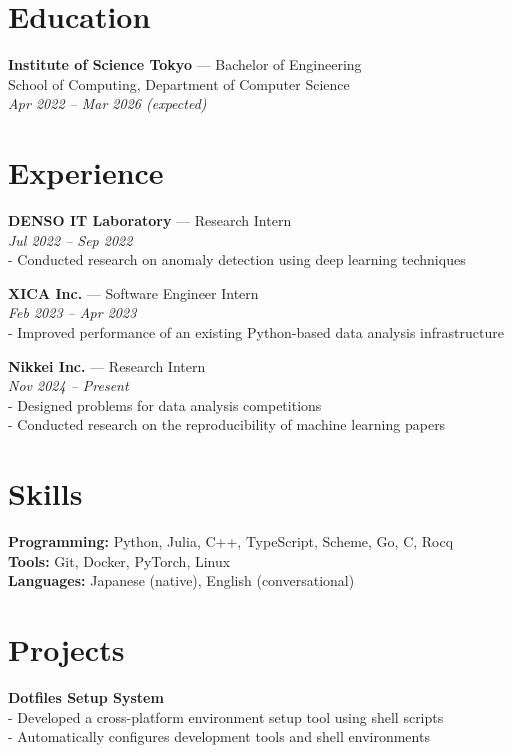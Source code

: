 \begin{multicols}{2}


\section*{Education}
\textbf{Institute of Science Tokyo} — Bachelor of Engineering \\
{\small School of Computing, Department of Computer Science} \\
{\footnotesize\textit{Apr 2022 – Mar 2026 (expected)}}


\section*{Experience}

\textbf{DENSO IT Laboratory} — Research Intern \\
{\footnotesize\textit{Jul 2022 – Sep 2022}} \\
{\small - Conducted research on anomaly detection using deep learning techniques}


\textbf{XICA Inc.} — Software Engineer Intern \\
{\footnotesize\textit{Feb 2023 – Apr 2023}} \\
{\small - Improved performance of an existing Python-based data analysis infrastructure}


\textbf{Nikkei Inc.} — Research Intern \\
{\footnotesize\textit{Nov 2024 – Present}} \\
{\small 
- Designed problems for data analysis competitions \\
- Conducted research on the reproducibility of machine learning papers
}

\section*{Skills}
{\small
\textbf{Programming:} Python, Julia, C++, TypeScript, Scheme, Go, C, Rocq \\
\textbf{Tools:} Git, Docker, PyTorch, Linux \\
\textbf{Languages:} Japanese (native), English (conversational)
}

\columnbreak


\section*{Projects}
\textbf{Dotfiles Setup System} \\
{\small
- Developed a cross-platform environment setup tool using shell scripts \\
- Automatically configures development tools and shell environments
}



\end{multicols}
